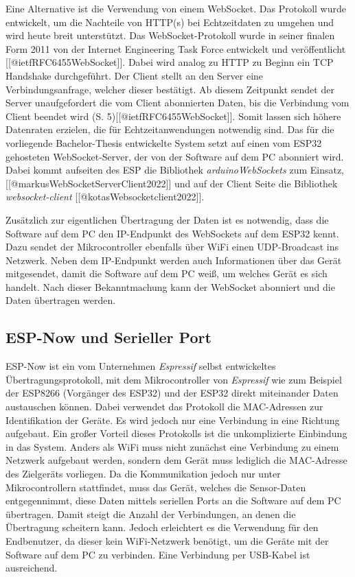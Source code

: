 Eine Alternative ist die Verwendung von einem WebSocket.
Das Protokoll wurde entwickelt, um die Nachteile von HTTP(s) bei Echtzeitdaten zu umgehen und wird heute breit unterstützt.
Das WebSocket-Protokoll wurde in seiner finalen Form 2011 von der Internet Engineering Task Force entwickelt und veröffentlicht [[@ietfRFC6455WebSocket]].
Dabei wird analog zu HTTP zu Beginn ein TCP Handshake durchgeführt. Der Client stellt an den Server eine Verbindungsanfrage, welcher dieser bestätigt.
Ab diesem Zeitpunkt sendet der Server unaufgefordert die vom Client abonnierten Daten, bis die Verbindung vom Client beendet wird (S. 5)[[@ietfRFC6455WebSocket]].
Somit lassen sich höhere Datenraten erzielen, die für Echtzeitanwendungen notwendig sind.
Das für die vorliegende Bachelor-Thesis entwickelte System setzt auf einen vom ESP32 gehosteten WebSocket-Server, der von der Software auf dem PC abonniert wird.
Dabei kommt aufseiten des ESP die Bibliothek \textit{arduinoWebSockets} zum Einsatz, [[@markusWebSocketServerClient2022]] und auf der Client Seite die Bibliothek \textit{websocket-client} [[@kotasWebsocketclient2022]].

Zusätzlich zur eigentlichen Übertragung der Daten ist es notwendig, dass die Software auf dem PC den IP-Endpunkt des WebSockets auf dem ESP32 kennt.
Dazu sendet der Mikrocontroller ebenfalls über WiFi einen UDP-Broadcast ins Netzwerk.
Neben dem IP-Endpunkt werden auch Informationen über das Gerät mitgesendet, damit die Software auf dem PC weiß, um welches Gerät es sich handelt.
Nach dieser Bekanntmachung kann der WebSocket abonniert und die Daten übertragen werden.

\subsection{ESP-Now und Serieller Port}
ESP-Now ist ein vom Unternehmen \textit{Espressif} selbst entwickeltes Übertragungsprotokoll, mit dem Mikrocontroller von \textit{Espressif} wie zum Beispiel der ESP8266 (Vorgänger des ESP32) und der ESP32 direkt miteinander Daten austauschen können.
Dabei verwendet das Protokoll die MAC-Adressen zur Identifikation der Geräte.
Es wird jedoch nur eine Verbindung in eine Richtung aufgebaut.
Ein großer Vorteil dieses Protokolls ist die unkomplizierte Einbindung in das System.
Anders als WiFi muss nicht zunächst eine Verbindung zu einem Netzwerk aufgebaut werden, sondern dem Gerät muss lediglich die MAC-Adresse des Zielgeräts vorliegen.
Da die Kommunikation jedoch nur unter Mikrocontrollern stattfindet, muss das Gerät, welches die Sensor-Daten entgegennimmt, diese Daten mittels seriellen Ports an die Software auf dem PC übertragen.
Damit steigt die Anzahl der Verbindungen, an denen die Übertragung scheitern kann.
Jedoch erleichtert es die Verwendung für den Endbenutzer, da dieser kein WiFi-Netzwerk benötigt, um die Geräte mit der Software auf dem PC zu verbinden.
Eine Verbindung per USB-Kabel ist ausreichend.

